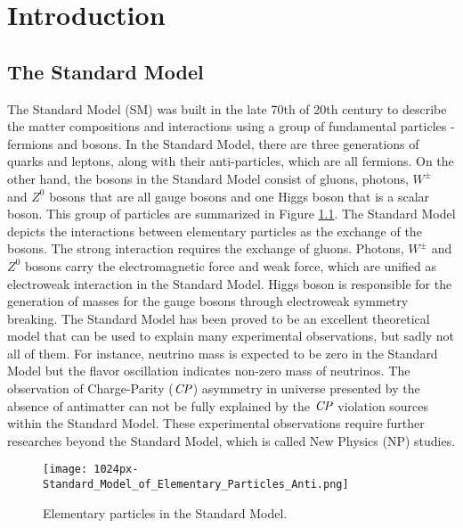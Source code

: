 \chapter{Introduction}

\section{The Standard Model}
The Standard Model (SM) was built in the late 70th of 20th century to  describe the matter compositions and interactions using a group of fundamental particles - fermions and bosons. 
In the Standard Model, there are three generations of quarks and leptons, along with their anti-particles, which are all fermions. On the other hand, the bosons in the Standard Model consist of gluons, photons, $W^{\pm}$ and $Z^0$ bosons that are all gauge bosons and one Higgs boson that is a scalar boson. This group of particles are summarized in Figure \ref{fig:sm-table}. The Standard Model depicts the interactions between elementary particles as the exchange of the bosons. The strong interaction requires the exchange of gluons. Photons, $W^{\pm}$ and $Z^0$ bosons carry the electromagnetic force and weak force, which are unified as electroweak interaction in the Standard Model. Higgs boson is responsible for the generation of masses for the gauge bosons through electroweak symmetry breaking\cite{aad2012observation}. The Standard Model has been proved to be an excellent theoretical model that can be used to explain many experimental observations, but sadly not all of them. For instance, neutrino mass is expected to be zero in the Standard Model but the flavor oscillation indicates non-zero mass of neutrinos. The observation of Charge-Parity ($\it{CP}$) asymmetry in universe presented by the absence of antimatter can not be fully explained by the $\it{CP}$ violation sources within the Standard Model. These experimental observations require further researches beyond the Standard Model, which is called New Physics (NP) studies. 
\begin{figure}[H]
	\centering
	\texttt{[image: 1024px-Standard\_Model\_of\_Elementary\_Particles\_Anti.png]}
	\caption{Elementary particles in the Standard Model.\cite{sm_particles}}
	\label{fig:sm-table}
\end{figure}

